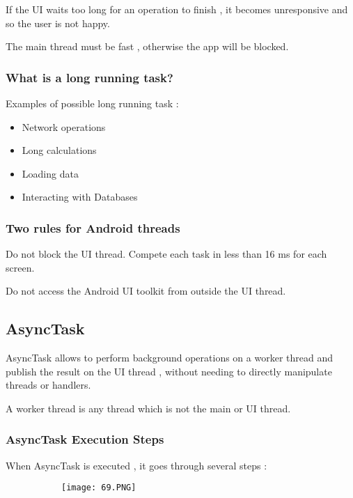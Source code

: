 \documentclass{article}
\begin{document}
If the UI waits too long for an operation to finish , it becomes unresponsive and so the user is not happy.

The main thread must be fast , otherwise the app will be blocked.

\subsubsection{What is a long running task?}

Examples of possible long running task :

\begin{itemize}
    \item Network operations
    \item Long calculations
    \item Loading data
    \item Interacting with Databases
\end{itemize}

\subsubsection{Two rules for Android threads}

Do not block the UI thread. Compete each task in less than 16 ms for each screen.

Do not access the Android UI toolkit from outside the UI thread.

\subsection{AsyncTask}

AsyncTask allows to perform background operations on a worker thread and publish the result on the UI thread , without needing to directly manipulate threads or handlers.

A worker thread is any thread which is not the main or UI thread.

\subsubsection{AsyncTask Execution Steps}



When AsyncTask is executed , it goes through several steps :

  \begin{figure}[ht!]
  \centering
  \begin{subfigure}[b]{.7\linewidth}
  \texttt{[image: 69.PNG]}
  \end{subfigure}
  \end{figure}
\end{document}
